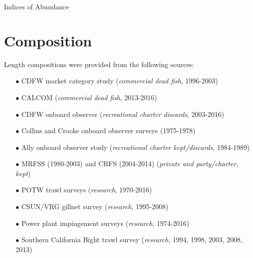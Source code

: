 \documentclass[ignorenonframetext,]{beamer}
\begin{document}
\begin{frame}{Indices of Abundance}

\end{frame}

\section{Composition}\label{composition}

\begin{frame}{Length compositions were provided from the following
sources:}

\begin{itemize}
  \item[$\bullet$] CDFW market category study (\emph{commercial dead fish}, 1996-2003)    
  \item[$\bullet$] CALCOM (\emph{commercial dead fish}, 2013-2016)    
  \item[$\bullet$] CDFW onboard observer (\emph{recreational charter discards}, 2003-2016)  
  \item[$\bullet$] Collins and Crooke onboard observer surveys (1975-1978) 
  \item[$\bullet$] Ally onboard observer study (\emph{recreational charter kept/discards}, 1984-1989)  
  \item[$\bullet$] MRFSS (1980-2003) and CRFS (2004-2014) (\emph{private and party/charter, kept})
  \item[$\bullet$] POTW trawl surveys (\emph{research}, 1970-2016)      
  \item[$\bullet$] CSUN/VRG gillnet survey (\emph{research}, 1995-2008)        
  \item[$\bullet$] Power plant impingement surveys (\emph{research}, 1974-2016)  
  \item[$\bullet$] Southern California Bight trawl survey (\emph{research}, 1994, 1998, 2003, 2008, 2013) 
\end{itemize}

\end{frame}
\end{document}
